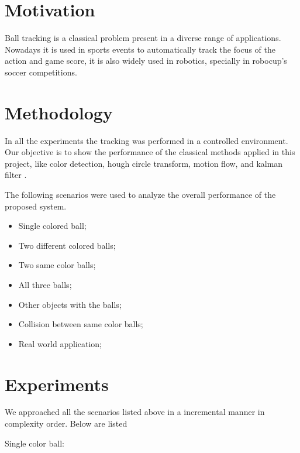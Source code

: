 \documentclass{sciposter}
\begin{document}
\begin{multicols}{3}


\section{Motivation}

Ball tracking is a classical problem present in a diverse range of applications. Nowadays it is used in sports events to automatically track the focus of the action and game score, it is also widely used in robotics, specially in robocup's soccer competitions.

\section{Methodology}

In all the experiments the tracking was performed in a controlled environment. Our objective is to show the performance of the classical methods applied in this project, like color detection, hough circle transform, motion flow, and kalman filter .

\bigbreak

The following scenarios were used to analyze the overall performance of the proposed system.

\begin{itemize}

\item Single colored ball;
\item Two different colored balls;
\item Two same color balls;
\item All three balls;
\item Other objects with the balls;
\item Collision between same color balls;
\item Real world application;

\end{itemize}

\section{Experiments}

We approached all the scenarios listed above in a incremental manner in complexity order. Below are listed

\bigbreak
Single color ball:


\end{multicols}
\end{document}
